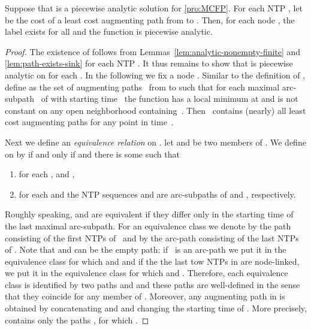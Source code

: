 \documentclass{svjour3}                     \smartqed
\begin{document}
\begin{theorem}
\label{thm:CDSP-analytic}
Suppose that  is a piecewise analytic solution for \eqref{pro:MCFP}. For each NTP , let  be the cost of a least cost augmenting path from  to . Then, for each node , the label  exists for all  and the function  is piecewise analytic.
\end{theorem}

\begin{proof}
 The existence of  follows from Lemmas~\ref{lem:analytic-nonempty-finite} and \ref{lem:path-exists-sink} for each NTP . It thus remains to show that  is piecewise analytic on  for each .  In the following we fix a node . Similar to the definition of , define  as the set of augmenting paths~ from  to  such that for each maximal arc-subpath~ of  with starting time~ the function  has a local minimum at  and is not constant on any open neighborhood containing~. Then~ contains (nearly) all least cost augmenting paths for any point in time~.

  Next we define an \emph{equivalence relation}  on . let  and  be two members of . We define  on  by  if and only if  and there is some  such that
\begin{enumerate}[label = (\roman*)]
 \item  for each ,  and ,
 \item  for each  and the NTP sequences  and  are arc-subpaths of  and , respectively.
\end{enumerate}

  Roughly speaking,  and  are equivalent if they differ only in the starting time of the last maximal arc-subpath. For an equivalence class  we denote by  the path consisting of the first  NTPs of~ and by  the arc-path consisting of the last  NTPs of . Note that  and  can be the empty path: if~ is an arc-path we put it in the equivalence class for which  and  and if the the last tow NTPs in  are node-linked, we put it in the equivalence class for which  and . Therefore, each equivalence class  is identified by two paths  and  and these paths are well-defined in the sense that they coincide for any member of . Moreover, any augmenting path in  is obtained by concatenating  and  and changing the starting time of . More precisely,  contains only the paths , for which . 


\end{proof}
\end{document}

